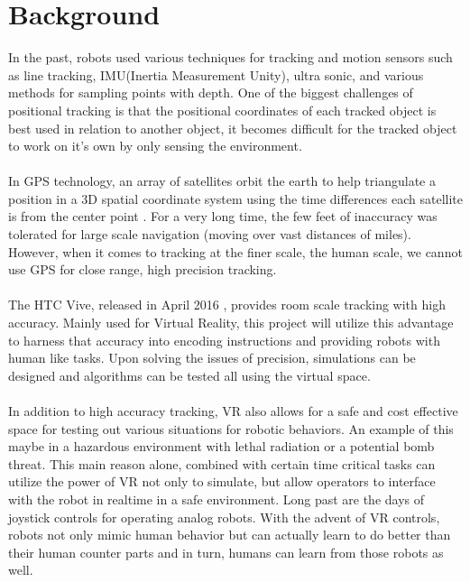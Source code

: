 \documentclass[10pt,a4paper]{article}
\begin{document}
	\section*{Background}
	In the past, robots used various techniques for tracking and motion sensors such as line tracking, IMU(Inertia Measurement Unity), ultra sonic, and various methods for sampling points with depth. One of the biggest challenges of positional tracking is that the positional coordinates of each tracked object is best used in relation to another object, it becomes difficult for the tracked object to work on it's own by only sensing the environment.
	\\\\
	In GPS technology, an array of satellites orbit the earth to help triangulate a position in a 3D spatial coordinate system using the time differences each satellite is from the center point \cite{gizmodo1}. For a very long time, the few feet of inaccuracy was tolerated for large scale navigation (moving over vast distances of miles). However, when it comes to tracking at the finer scale, the human scale, we cannot use GPS for close range, high precision tracking.
	\\\\
	The HTC Vive, released in April 2016 \cite{techradar1}, provides room scale tracking with high accuracy. Mainly used for Virtual Reality, this project will utilize this advantage to harness that accuracy into encoding instructions and providing robots with human like tasks. Upon solving the issues of precision, simulations can be designed and algorithms can be tested all using the virtual space.
	\\\\
	In addition to high accuracy tracking, VR also allows for a safe and cost effective space for testing out various situations for robotic behaviors. An example of this maybe in a hazardous environment\cite{Bugalia} with lethal radiation or a potential bomb threat\cite{Codd-Downey}. This main reason alone, combined with certain time critical tasks can utilize the power of VR not only to simulate, but allow operators to interface with the robot in realtime in a safe environment. Long past are the days of joystick controls for operating analog robots. With the advent of VR controls, robots not only mimic human behavior but can actually learn to do better than their human counter parts and in turn, humans can learn from those robots as well.
	
\end{document}
